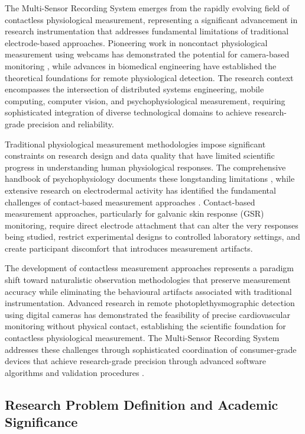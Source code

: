 \documentclass[11pt,a4paper]{report}
\begin{document}
The Multi-Sensor Recording System emerges from the rapidly evolving field of contactless physiological measurement, representing a significant advancement in research instrumentation that addresses fundamental limitations of traditional electrode-based approaches. Pioneering work in noncontact physiological measurement using webcams has demonstrated the potential for camera-based monitoring \cite{poh2010noncontact}, while advances in biomedical engineering have established the theoretical foundations for remote physiological detection. The research context encompasses the intersection of distributed systems engineering, mobile computing, computer vision, and psychophysiological measurement, requiring sophisticated integration of diverse technological domains to achieve research-grade precision and reliability.

Traditional physiological measurement methodologies impose significant constraints on research design and data quality that have limited scientific progress in understanding human physiological responses. The comprehensive handbook of psychophysiology documents these longstanding limitations \cite{cacioppo2007handbook}, while extensive research on electrodermal activity has identified the fundamental challenges of contact-based measurement approaches \cite{boucsein2012eda}. Contact-based measurement approaches, particularly for galvanic skin response (GSR) monitoring, require direct electrode attachment that can alter the very responses being studied, restrict experimental designs to controlled laboratory settings, and create participant discomfort that introduces measurement artifacts.

The development of contactless measurement approaches represents a paradigm shift toward naturalistic observation methodologies that preserve measurement accuracy while eliminating the behavioural artifacts associated with traditional instrumentation. Advanced research in remote photoplethysmographic detection using digital cameras has demonstrated the feasibility of precise cardiovascular monitoring without physical contact, establishing the scientific foundation for contactless physiological measurement. The Multi-Sensor Recording System addresses these challenges through sophisticated coordination of consumer-grade devices that achieve research-grade precision through advanced software algorithms and validation procedures \cite{bucika2024repo}.

\subsection{Research Problem Definition and Academic Significance}
\end{document}
